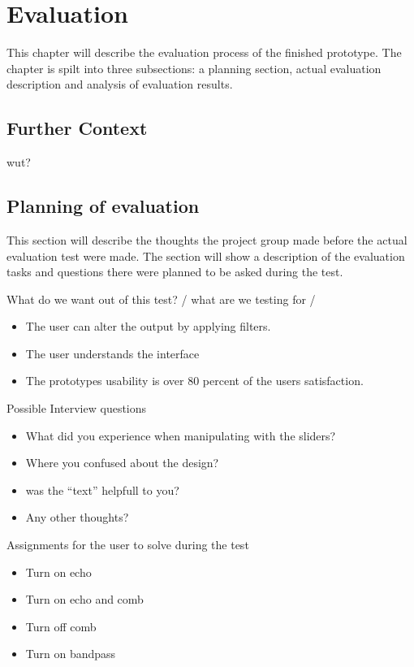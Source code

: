 \chapter{Evaluation}\label{ch:evaluation}
This chapter will describe the evaluation process of the finished prototype. The chapter is spilt into three subsections: a planning section, actual evaluation description and analysis of evaluation results. 

\section{Further Context}\label{sec:furthercontext}
 wut?

\section{Planning of evaluation}
This section will describe the thoughts the project group made before the actual evaluation test were made. The section will show a description of the evaluation tasks and questions there were planned to be asked during the test. 

What do we want out of this test? / what are we testing for / 

\begin{itemize}
\item The user can alter the output by applying filters.
\item The user understands the interface  
\item The prototypes usability is over 80 percent of the users satisfaction.
\end{itemize}

Possible Interview questions
\begin{itemize}
\item What did you experience when manipulating with the sliders?
\item Where you confused about the design?
\item was the “text” helpfull to you?
\item Any other thoughts?
\end{itemize}

Assignments for the user to solve during the test 
\begin{itemize}
\item Turn on echo
\item Turn on echo and comb
\item Turn off comb
\item Turn on bandpass 
\end{itemize}


